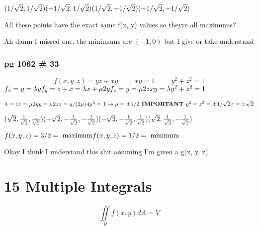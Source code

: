 \documentclass{report}
\begin{document}
\noindent $
(1/ \sqrt{2}, 1/ \sqrt{2}) \\
(-1/ \sqrt{2}, 1/ \sqrt{2}) \\
(1/ \sqrt{2}, -1/ \sqrt{2}) \\
(-1/ \sqrt{2}, -1/ \sqrt{2}) \\
$

All these points have the exact same f(x, y) values so theyre all maximums?

Ah damn I missed one. the minimums are $(\pm 1, 0)$ but I give or take understand

\newpage
\subsection*{pg 1062 \# 33}
$$
f(x, y, z) = yz + xy \hspace{1cm}
xy = 1 \hspace{1cm}
y^2 + z^2 = 1
$$
$
f_x = y = \lambda y \\
f_y = z + x = \lambda x + \mu 2y \\
f_z = y = \mu 2z \\
xy = \lambda  \\ 
y^2 + z^2 = 1
$
\newline

\noindent $
\lambda = 1 \\
z = \mu 2y \\
y = \mu 2z \\
z = y/(2\mu) \\
4\mu^2 = 1 \rightarrow \mu = \pm 1/2 \textbf{ IMPORTANT }\\ 
y^2 = z^2 = \pm 1/\sqrt{2} \\
x = \pm \sqrt{2}
$
\newline

\noindent $
(\sqrt{2}, \frac{1}{\sqrt{2}}, \frac{1}{\sqrt{2}}) \\
(-\sqrt{2}, -\frac{1}{\sqrt{2}}, -\frac{1}{\sqrt{2}}) \\
(-\sqrt{2}, -\frac{1}{\sqrt{2}}, \frac{1}{\sqrt{2}}) \\
(\sqrt{2}, \frac{1}{\sqrt{2}}, -\frac{1}{\sqrt{2}})
$
\newline

$
f(x, y, z) = 3/2 = \text{ maximum} \\
f(x, y, z) = 1/2 = \text{ minimum}
$

Okay I think I understand this shit assuming I'm given a g(x, y, z)

\chapter{15 Multiple Integrals}
$$
\iint \limits_R f(x, y) dA = V
$$
\end{document}
